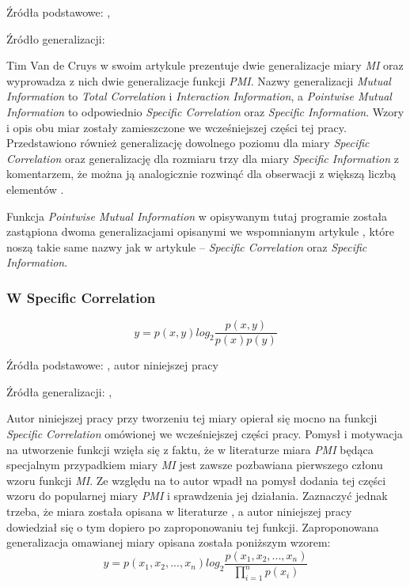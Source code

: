 Źródła podstawowe: \cite[str. 18]{pecina_measures}, \cite[str. 2]{mmi_w11}
\par
Źródło generalizacji: \cite{generalization_patterns}
\par
Tim Van de Cruys w swoim artykule \cite{mmi_w11} prezentuje dwie generalizacje miary \emph{MI} oraz wyprowadza z nich dwie generalizacje funkcji \emph{PMI}.
Nazwy generalizacji \emph{Mutual Information} to \emph{Total Correlation} i \emph{Interaction Information}, a \emph{Pointwise Mutual Information} to odpowiednio \emph{Specific Correlation} oraz \emph{Specific Information}. 
Wzory i opis obu miar zostały zamieszczone we wcześniejszej części tej pracy.
Przedstawiono również generalizację dowolnego poziomu dla miary \emph{Specific Correlation} oraz generalizację dla rozmiaru trzy dla miary \emph{Specific Information} z komentarzem, że można ją analogicznie rozwinąć dla obserwacji z większą liczbą elementów \cite[str. 3]{mmi_w11}.
\par
Funkcja \emph{Pointwise Mutual Information} w opisywanym tutaj programie została zastąpiona dwoma generalizacjami opisanymi we wspomnianym artykule \cite{mmi_w11}, które noszą takie same nazwy jak w artykule -- \emph{Specific Correlation} oraz \emph{Specific Information}. 

\subsubsection{W Specific Correlation}
$$ y = p(x, y) log_{2}\frac{p(x, y)}{p(x)p(y)} $$

Źródła podstawowe: \cite{wsec}, autor niniejszej pracy
\par
Źródła generalizacji: \cite{generalization_patterns}, \cite[str. 2]{mmi_w11}
\par
Autor niniejszej pracy przy tworzeniu tej miary opierał się mocno na funkcji \emph{Specific Correlation} omówionej we wcześniejszej części pracy.
Pomysł i motywacja na utworzenie funkcji wzięła się z faktu, że w literaturze miara \emph{PMI} będąca specjalnym przypadkiem miary \emph{MI} jest zawsze pozbawiana pierwszego członu wzoru funkcji \emph{MI}.
Ze względu na to autor wpadł na pomysł dodania tej części wzoru do popularnej miary \emph{PMI} i sprawdzenia jej działania.
Zaznaczyć jednak trzeba, że miara została opisana w literaturze \cite{wsec}, a autor niniejszej pracy dowiedział się o tym dopiero po zaproponowaniu tej funkcji.
Zaproponowana generalizacja omawianej miary opisana została poniższym wzorem:
$$ y = p(x_{1}, x_{2}, ..., x_{n}) log_{2}\frac{p(x_{1}, x_{2}, ..., x_{n})}{\prod_{i = 1}^{n} p(x_{i})} $$

